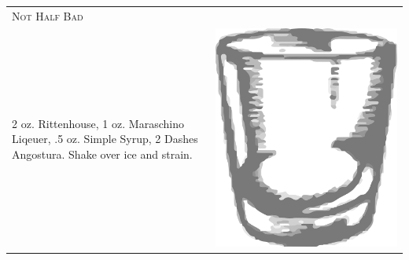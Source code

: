 \documentclass{article}
\begin{document}
\begin{tabular}{p{2in} p{0.5in}}
\multicolumn{2}{p{3in}}{\centering\Huge\textsc{Not Half Bad}} \\ 
   \vspace{-0.1in}2 oz. Rittenhouse, 1 oz. Maraschino Liqeuer, .5 oz. Simple Syrup, 2 Dashes Angostura. Shake over ice and strain. &
   \vspace{-0.1in} \includegraphics{rocks_glass.png}
\end{tabular}
\end{document}
